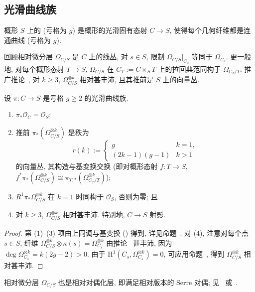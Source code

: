 \subsection{光滑曲线族}\label{src:6.1.5-subsection}
\begin{definition}\label{src:6.1.15}
概形 $S$ 上的 (亏格为 $g$) 是概形的光滑固有态射 $C\to\allowbreak S$, 使得每个几何纤维都是连通曲线 (亏格为 $g$).
\end{definition}
回顾相对微分层 $\Omega_{C/S}$ 是 $C$ 上的线丛, 对 $s\in S$, 限制 $\Omega_{C/S}|_{C_s}$ 等同于 $\Omega_{C_s}$. 更一般地, 对每个概形态射 $T\to\allowbreak S$, $\Omega_{C/S}$ 在 $C_T:=C\times_S T$ 上的拉回典范同构于 $\Omega_{C_T/T}$. 推广推论~, 对 $k\geq3$, $\Omega_{C/S}^{\otimes k}$ 相对甚丰沛, 且其推前是 $S$ 上的向量丛.
\begin{proposition}[光滑曲线族的性质]\label{src:6.1.16}
设 $\pi:C\to\allowbreak S$ 是亏格 $g\geq2$ 的光滑曲线族.
\begin{enumerate}[(1)]
\item $\pi_*\mathcal O_C=\mathcal O_S$;
\item 推前 $\pi_*(\Omega_{C/S}^{\otimes k})$ 是秩为
\[
r(k):=\begin{cases}g&k=1,\\(2k-1)(g-1)&k>1\end{cases}
\]
的向量丛, 其构造与基变换交换 (即对概形态射 $f:T\to\allowbreak S$, $f^*\pi_*(\Omega_{C/S}^{\otimes k})\cong\pi_{T,\allowbreak *}(\Omega_{C_T/T}^{\otimes k})$);
\item $R^1\pi_*\Omega_{C/S}^{\otimes k}$ 在 $k=1$ 时同构于 $\mathcal O_S$, 否则为零; 且
\item 对 $k\geq3$, $\Omega_{C/S}^{\otimes k}$ 相对甚丰沛. 特别地, $C\to\allowbreak S$ 射影.
\end{enumerate}
\end{proposition}
\begin{proof}
第 (1)--(3) 项由上同调与基变换 () 得到, 详见命题~. 对 (4), 注意对每个点 $s\in S$, 纤维 $\Omega_{C/S}^{\otimes k}\otimes\kappa(s)=\Omega_{C_s}^{\otimes k}$ 由推论~ 甚丰沛, 因为 $\deg\Omega_{C_s}^{\otimes k}=k(2g-2)>0$. 由于 $\mathrm H^1(C_s,\allowbreak \Omega_{C_s}^{\otimes k})=0$, 可应用命题~, 得到 $\Omega_{C/S}^{\otimes k}$ 相对甚丰沛.
\end{proof}
相对微分层 $\Omega_{C/S}$ 也是相对对偶化层, 即满足相对版本的 Serre 对偶; 见~\cite{Har66c} 或~\cite[\S 6.4]{Liu02}.
